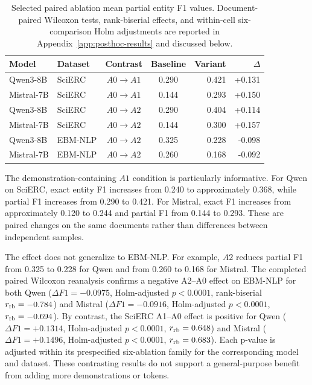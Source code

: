 \documentclass[fleqn,10pt]{wlscirep-authoryear}
\begin{document}
\begin{table}[t]
\centering
\caption{Selected paired ablation mean partial entity F1 values.
Document-paired Wilcoxon tests, rank-biserial effects, and within-cell
six-comparison Holm adjustments are reported in Appendix~\ref{app:posthoc-results} and discussed below.}
\label{tab:ablation-selected}
\begin{tabular}{llccrr}
\toprule
Model & Dataset & Contrast & Baseline & Variant & $\Delta$ \\
\midrule
Qwen3-8B
& SciERC
& $A0\rightarrow A1$
& 0.290 & 0.421 & +0.131 \\

Mistral-7B
& SciERC
& $A0\rightarrow A1$
& 0.144 & 0.293 & +0.150 \\

Qwen3-8B
& SciERC
& $A0\rightarrow A2$
& 0.290 & 0.404 & +0.114 \\

Mistral-7B
& SciERC
& $A0\rightarrow A2$
& 0.144 & 0.300 & +0.157 \\

Qwen3-8B
& EBM-NLP
& $A0\rightarrow A2$
& 0.325 & 0.228 & -0.098 \\

Mistral-7B
& EBM-NLP
& $A0\rightarrow A2$
& 0.260 & 0.168 & -0.092 \\
\bottomrule
\end{tabular}
\end{table}

The demonstration-containing $A1$ condition is particularly informative.
For Qwen on SciERC, exact entity F1 increases from 0.240 to approximately 0.368,
while partial F1 increases from 0.290 to 0.421. For Mistral, exact F1 increases
from approximately 0.120 to 0.244 and partial F1 from 0.144 to 0.293. These are
paired changes on the same documents rather than differences between independent
samples.

The effect does not generalize to EBM-NLP. For example, $A2$ reduces partial F1
from 0.325 to 0.228 for Qwen and from 0.260 to 0.168 for Mistral. %
The completed paired Wilcoxon reanalysis confirms a negative A2--A0 effect on
EBM-NLP for both Qwen ($\Delta F1=-0.0975$, Holm-adjusted $p<0.0001$,
rank-biserial $r_{\rm rb}=-0.784$) and Mistral ($\Delta F1=-0.0916$,
Holm-adjusted $p<0.0001$, $r_{\rm rb}=-0.694$). By contrast, the SciERC
A1--A0 effect is positive for Qwen ($\Delta F1=+0.1314$,
Holm-adjusted $p<0.0001$, $r_{\rm rb}=0.648$) and Mistral
($\Delta F1=+0.1496$, Holm-adjusted $p<0.0001$,
$r_{\rm rb}=0.683$). Each p-value is adjusted within its prespecified
six-ablation family for the corresponding model and dataset. These
contrasting results do not support a general-purpose benefit from adding
more demonstrations or tokens.
\end{document}
